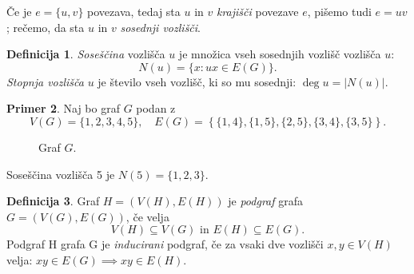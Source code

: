 \documentclass[12pt,a4paper]{amsart}
\theoremstyle{definition} %
\newtheorem{definicija}{Definicija}[section]
\newtheorem{primer}[definicija]{Primer}
\theoremstyle{plain} %
\newcommand{\graf}[1][G]{\ensuremath{#1 = (V(#1), E(#1))}}
\newcommand{\vozlisca}[1][G]{\ensuremath{V(#1)}}
\newcommand{\povezave}[1][G]{\ensuremath{E(#1)}}
\DeclareMathOperator {\stopnja} {deg}
\begin{document}
Če je $e = \{ u,v \}$ povezava, tedaj sta $u$ in $v$ \emph{krajišči} povezave $e$, pišemo tudi $e = uv$; rečemo, da sta $u$ in $v$ \emph{sosednji vozlišči}.

\begin{definicija}
	\emph{Soseščina} vozlišča $u$ je množica vseh sosednjih vozlišč vozlišča $u$:
	\[ N(u) = \{ x\colon ux \in \povezave \} .\]
	\emph{Stopnja vozlišča} $u$ je število vseh vozlišč, ki so mu sosednji: $\stopnja u = |N(u)|$.
\end{definicija}

\begin{primer}
    \label{primer:sosedi}
    Naj bo graf $G$ podan z \[\vozlisca = \{ 1,2,3,4,5 \}, \quad \povezave = \left\{ \{1,4\},\{1,5\},\{2,5\},\{3,4\},\{3,5\} \right\}.\]
    \begin{figure}[h]
        \caption{Graf $G$.}
    \end{figure}
    Soseščina vozlišča 5 je $N(5) = \{1,2,3\}$.
\end{primer}

\begin{definicija}
	Graf $\graf[H]$ je \emph{podgraf} grafa $\graf$, če velja 
	\[ \vozlisca[H] \subseteq \vozlisca \text{ in } \povezave[H] \subseteq \povezave. \]
	Podgraf H grafa G je \emph{inducirani} podgraf, če za vsaki dve vozlišči $x,y\in \vozlisca[H]$ velja: $xy \in \povezave \implies xy \in \povezave[H]$.
\end{definicija}
\end{document}

